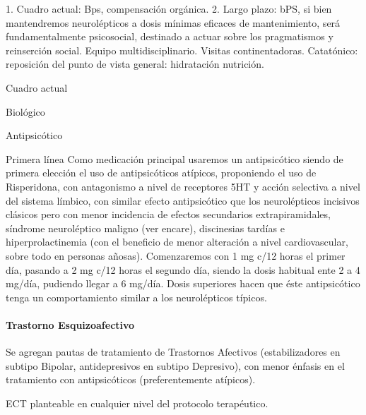 1. Cuadro actual: Bps, compensación orgánica. 2. Largo plazo: bPS, si bien mantendremos neurolépticos a dosis mínimas eficaces de mantenimiento, será fundamentalmente psicosocial, destinado a actuar sobre los pragmatismos y reinserción social. Equipo multidisciplinario. Visitas continentadoras. Catatónico: reposición del punto de vista general: hidratación nutrición.

Cuadro actual

Biológico

Antipsicótico

Primera línea Como medicación principal usaremos un antipsicótico siendo de primera elección el uso de antipsicóticos atípicos, proponiendo el uso de Risperidona, con antagonismo a nivel de receptores 5HT y acción selectiva a nivel del sistema límbico, con similar efecto antipsicótico que los neurolépticos incisivos clásicos pero con menor incidencia de efectos secundarios extrapiramidales, síndrome neuroléptico maligno (ver encare), discinesias tardías e hiperprolactinemia (con el beneficio de menor alteración a nivel cardiovascular, sobre todo en personas añosas). Comenzaremos con 1 mg c/12 horas el primer día, pasando a 2 mg c/12 horas el segundo día, siendo la dosis habitual ente 2 a 4 mg/día, pudiendo llegar a 6 mg/día. Dosis superiores hacen que éste antipsicótico tenga un comportamiento similar a los neurolépticos típicos.

\paragraph{Trastorno Esquizoafectivo}
Se agregan pautas de tratamiento de Trastornos Afectivos (estabilizadores en subtipo Bipolar, antidepresivos en subtipo Depresivo), con menor énfasis en el tratamiento con antipsicóticos (preferentemente atípicos).

ECT planteable en cualquier nivel del protocolo terapéutico.

